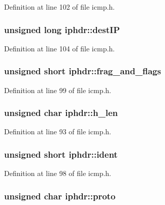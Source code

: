 \-Definition at line 102 of file icmp.\-h.

\hypertarget{structiphdr_a7131889c7b92b38bdeaac511bf7b6cc4}{
\subsubsection[{dest\-I\-P}]{\setlength{\rightskip}{0pt plus 5cm}unsigned long {\bf iphdr\-::dest\-I\-P}}}\label{structiphdr_a7131889c7b92b38bdeaac511bf7b6cc4}


\-Definition at line 104 of file icmp.\-h.

\hypertarget{structiphdr_a0d2e71cfe4d60b3fd494f89defd36403}{
\subsubsection[{frag\-\_\-and\-\_\-flags}]{\setlength{\rightskip}{0pt plus 5cm}unsigned short {\bf iphdr\-::frag\-\_\-and\-\_\-flags}}}\label{structiphdr_a0d2e71cfe4d60b3fd494f89defd36403}


\-Definition at line 99 of file icmp.\-h.

\hypertarget{structiphdr_a73f32935489a36a25baa9672f7e82cd0}{
\subsubsection[{h\-\_\-len}]{\setlength{\rightskip}{0pt plus 5cm}unsigned char {\bf iphdr\-::h\-\_\-len}}}\label{structiphdr_a73f32935489a36a25baa9672f7e82cd0}


\-Definition at line 93 of file icmp.\-h.

\hypertarget{structiphdr_a5b9e10a88a5e925dd2fe53ad6e29e7a7}{
\subsubsection[{ident}]{\setlength{\rightskip}{0pt plus 5cm}unsigned short {\bf iphdr\-::ident}}}\label{structiphdr_a5b9e10a88a5e925dd2fe53ad6e29e7a7}


\-Definition at line 98 of file icmp.\-h.

\hypertarget{structiphdr_a8a39de7dc525754725363dc25fc75ae2}{
\subsubsection[{proto}]{\setlength{\rightskip}{0pt plus 5cm}unsigned char {\bf iphdr\-::proto}}}\label{structiphdr_a8a39de7dc525754725363dc25fc75ae2}


